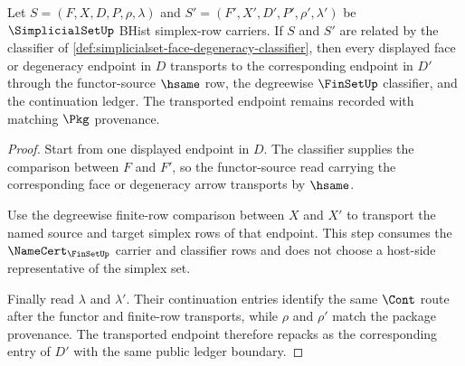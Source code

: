 \begin{theorem}
\label{thm:simplicialset-face-degeneracy-ledger-stability}
Let $S=(F,X,D,P,\rho,\lambda)$ and $S'=(F',X',D',P',\rho',\lambda')$ be $\SimplicialSetUp$ BHist simplex-row carriers. If $S$ and $S'$ are related by the classifier of \autoref{def:simplicialset-face-degeneracy-classifier}, then every displayed face or degeneracy endpoint in $D$ transports to the corresponding endpoint in $D'$ through the functor-source $\hsame$ row, the degreewise $\FinSetUp$ classifier, and the continuation ledger. The transported endpoint remains recorded with matching $\Pkg$ provenance.
\end{theorem}
\begin{proof}
Start from one displayed endpoint in $D$. The classifier supplies the comparison between $F$ and $F'$, so the functor-source read carrying the corresponding face or degeneracy arrow transports by $\hsame$.

Use the degreewise finite-row comparison between $X$ and $X'$ to transport the named source and target simplex rows of that endpoint. This step consumes the $\NameCert_{\FinSetUp}$ carrier and classifier rows and does not choose a host-side representative of the simplex set.

Finally read $\lambda$ and $\lambda'$. Their continuation entries identify the same $\Cont$ route after the functor and finite-row transports, while $\rho$ and $\rho'$ match the package provenance. The transported endpoint therefore repacks as the corresponding entry of $D'$ with the same public ledger boundary.
\end{proof}

